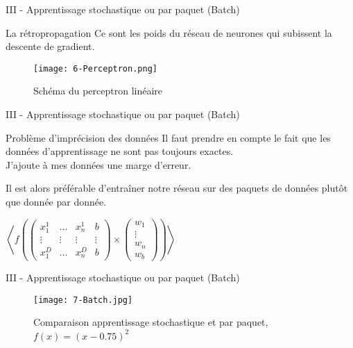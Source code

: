 \begin{frame}{III - Apprentissage stochastique ou par paquet (Batch)}
    \begin{block}{La rétropropagation}
        Ce sont les poids du réseau de neurones qui subissent la descente de gradient.
    \end{block}
    \begin{figure}
        \centering
        \texttt{[image: 6-Perceptron.png]}
        \caption{Schéma du perceptron linéaire}
    \end{figure}
    
\end{frame}


\begin{frame}{III - Apprentissage stochastique ou par paquet (Batch)}
    \begin{exampleblock}{Problème d'imprécision des données}
        Il faut prendre en compte le fait que les données d'apprentissage ne sont pas toujours exactes. \\
        J'ajoute à mes données une marge d'erreur. 
    \end{exampleblock}
    \begin{block}{}
        Il est alors préférable d'entraîner notre réseau sur des paquets de données plutôt que donnée par donnée. 
    \end{block}
    \begin{center}
        \centering
        $
            \left< f
            \left(
            \begin{pmatrix}
                    x_1^{1} & \ldots & x_n^{1} & b      \\
                    \vdots  & \vdots & \vdots  & \vdots \\
                    x_1^{D} & \ldots & x_n^{D} & b
                \end{pmatrix}
            \times
            \begin{pmatrix}
                    w_1    \\
                    \vdots \\
                    w_n    \\
                    w_b
                \end{pmatrix}
            \right) \right>
        $
    \end{center}
\end{frame}


\begin{frame}{III - Apprentissage stochastique ou par paquet (Batch)}
    \begin{figure}
        \centering
        \texttt{[image: 7-Batch.jpg]}
        \caption{Comparaison apprentissage stochastique et par paquet, $f(x) = (x-0.75)^2$}
    \end{figure}
\end{frame}
